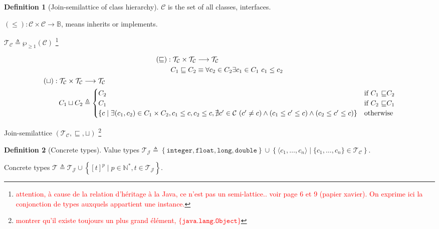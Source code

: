 \documentclass[english,dvips,ps2pdf,11pt]{article}
\let\powerset\wp
\theoremstyle{definition}
\newtheorem{definition}{Definition}[section]
\newcommand{\todo}[1]{\footnote{\textcolor{red}{#1}}}
\newcommand{\datainteger}[0]{\ensuremath{\texttt{integer}}\xspace}
\newcommand{\datafloat}[0]{\ensuremath{\texttt{float}}\xspace}
\newcommand{\datalong}[0]{\ensuremath{\texttt{long}}\xspace}
\newcommand{\datadouble}[0]{\ensuremath{\texttt{double}}\xspace}
\newcommand{\refarray}[2]{\ensuremath{[#2]^{#1}}\xspace}
\newcommand{\refobject}[1]{\ensuremath{\langle #1 \rangle}\xspace}
\newcommand{\valuetypes}[0]{\ensuremath{\mathcal{T_J}}\xspace}
\newcommand{\classtypes}[0]{\ensuremath{\mathcal{T_C}}\xspace}
\newcommand{\concretetypes}[0]{\ensuremath{\mathcal{T}}\xspace}
\newcommand{\classes}[0]{\ensuremath{\mathcal{C}}\xspace}
\newcommand{\jobject}[0]{\ensuremath{\texttt{java.lang.Object}}\xspace}
\newcommand{\inherits}[0]{\ensuremath{\leq}\xspace}
\newcommand{\cinherits}[0]{\ensuremath{\sqsubseteq}\xspace}
\newcommand{\cjoin}[0]{\ensuremath{\sqcup}\xspace}
\begin{document}
\begin{definition}[Join-semilattice of class hierarchy]
  $\classes$ is the set of all classes, interfaces.

  $(\inherits) : \classes \times \classes \longrightarrow \mathbb{B}$, means inherits or implements.

  $\classtypes \triangleq \powerset_{\geq 1}(\classes)$ \todo{attention, à cause de la relation d'héritage à la Java, ce n'est pas un semi-lattice.. voir page 6 et 9 (papier xavier). On exprime ici la conjonction de types auxquels appartient une instance.}

  \begin{gather*}
  \begin{aligned}
    (\cinherits) : \classtypes \times \classtypes & \longrightarrow \classtypes\\
    C_1 \cinherits C_2 & \equiv \forall c_2 \in C_2 \exists c_1 \in C_1\ c_1 \inherits c_2\\
  \end{aligned}\\
  \begin{aligned}
    (\cjoin) : \classtypes \times \classtypes & \longrightarrow \classtypes\\
    C_1 \cjoin C_2 & \triangleq \begin{cases}
      C_2 & \text{if $C_1$ \cinherits $C_2$}\\
      C_1 & \text{if $C_2$ \cinherits $C_1$}\\
      \left\{ c \mid \exists (c_1, c_2) \in C_1 \times C_2, c_1 \inherits c, c_2 \inherits c, \nexists c' \in \classes\ (c' \neq c) \wedge (c_1 \inherits c' \inherits c) \wedge (c_2 \inherits c' \inherits c) \right\} & \text{otherwise}\\
      \end{cases}
  \end{aligned}
  \end{gather*}

  Join-semilattice $(\classtypes, \cinherits, \cjoin)$
  \todo{montrer qu'il existe toujours un plus grand élément, $\{\jobject\}$}

\end{definition}

\begin{definition}[Concrete types]
  Value types $\valuetypes \triangleq \left\{ \datainteger, \datafloat, \datalong, \datadouble \right\} \cup \left\{ \refobject{c_1, \dots, c_n} \mid \{c_1,\dots, c_n\} \in \classtypes \right\}$.

  Concrete types $\concretetypes \triangleq \valuetypes \cup \left\{ \refarray{p}{t} \mid p \in \mathbb{N}^*, t \in \valuetypes \right\}$.
\end{definition}
\end{document}

